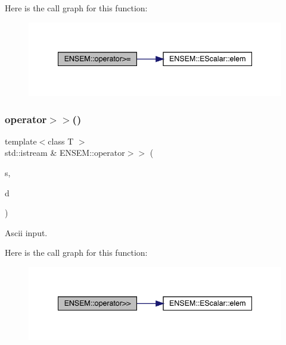 Here is the call graph for this function\+:
\nopagebreak
\begin{figure}[H]
\begin{center}
\leavevmode
\includegraphics[width=341pt]{d4/dca/group__escalar_ga9635179278abcc85536b21baae58904d_cgraph}
\end{center}
\end{figure}
\mbox{\label{group__escalar_gae1745a4a5cc3b43ab391d57412135dbd}} 
\subsubsection{\texorpdfstring{operator$>$$>$()}{operator>>()}\hspace{0.1cm}{\footnotesize\ttfamily [1/3]}}
{\footnotesize\ttfamily template$<$class T $>$ \\
std\+::istream \& E\+N\+S\+E\+M\+::operator$>$$>$ (\begin{DoxyParamCaption}\item[{std\+::istream \&}]{s,  }\item[{\mbox{\hyperlink{classENSEM_1_1EScalar}{E\+Scalar}}$<$ T $>$ \&}]{d }\end{DoxyParamCaption})\hspace{0.3cm}{\ttfamily [inline]}}



Ascii input. 

Here is the call graph for this function\+:
\nopagebreak
\begin{figure}[H]
\begin{center}
\leavevmode
\includegraphics[width=341pt]{d4/dca/group__escalar_gae1745a4a5cc3b43ab391d57412135dbd_cgraph}
\end{center}
\end{figure}
\mbox{\label{group__escalar_ga0011ba4db6e989d9517d29f0dd411ba4}} 
